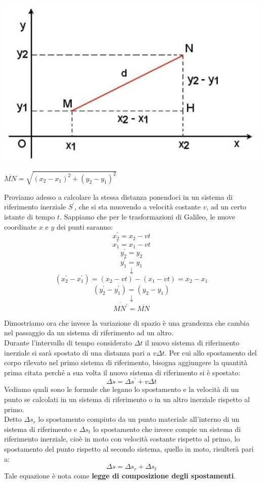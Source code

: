 \documentclass[a4paper,12pt, oneside]{book}
\begin{document}
\begin{center}
	\includegraphics[scale=0.5]{img/gal.png}
\end{center}
$\overline{MN}=\sqrt{(x_2-x_1)^2+(y_2-y_1)^2}$

Proviamo adesso a calcolare la stessa distanza ponendoci in un sistema di riferimento inerziale $S^{'}$, che si sta muovendo a velocità costante $v$, ad un certo istante di tempo $t$. Sappiamo che per le trasformazioni di Galileo, le nuove coordinate $x$ e $y$ dei punti saranno:
$$x^{'}_2=x_2-vt$$
$$x^{'}_1=x_1-vt$$
$$y^{'}_2=y_2$$
$$y^{'}_1=y_1$$
$$\downarrow$$
$$(x^{'}_2-x^{'}_1)=(x_2-vt)-(x_1-vt)=x_2-x_1$$
$$(y^{'}_2-y^{'}_1)=(y_2-y_1)$$
$$\downarrow$$
$$\overline{MN^{'}}=\overline{MN}$$

Dimostriamo ora che invece la variazione di spazio è una grandezza che cambia nel passaggio da un sistema di riferimento ad un altro.
\\ Durante l’intervallo di tempo considerato $\Delta t$ il nuovo sistema di riferimento inerziale si sarà spostato di una distanza pari a $v\Delta t$. Per cui allo spostamento del corpo rilevato nel primo sistema di riferimento, bisogna aggiungere la quantità prima citata perché a sua volta il nuovo sistema di riferimento si è spostato:
$$\Delta s=\Delta s^{'}+v\Delta t$$
Vediamo quali sono le formule che legano lo spostamento e la velocità di un punto se calcolati in un sistema di riferimento o in un altro inerziale rispetto al primo.\\
Detto $\Delta s_r$ lo spostamento compiuto da un punto materiale all'interno di un sistema di riferimento e $\Delta  s_t$ lo spostamento che invece compie un sistema di riferimento inerziale, cioè in moto con velocità costante rispetto al primo, lo spostamento del punto rispetto al secondo sistema, quello in moto, risulterà pari a:
$$\Delta s=\Delta s_r+\Delta s_t$$
Tale equazione è nota come \textbf{legge di composizione degli spostamenti}.\\
\end{document}
